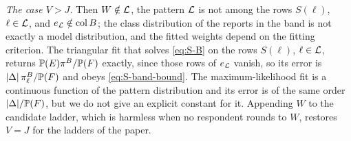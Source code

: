 \emph{The case $V>J$.} Then $W\notin\mathcal{L}$, the pattern $\mathcal{L}$ is not among the rows $S(\ell)$, $\ell\in\mathcal{L}$, and $e_{\mathcal{L}}\notin\operatorname{col}B$; the class distribution of the reports in the band is not exactly a model distribution, and the fitted weights depend on the fitting criterion. The triangular fit that solves \eqref{eq:S-B} on the rows $S(\ell)$, $\ell\in\mathcal{L}$, returns $\mathbb{P}(E)\pi^B/\mathbb{P}(F)$ exactly, since those rows of $e_{\mathcal{L}}$ vanish, so its error is $|\Delta|\,\pi^B_\ell/\mathbb{P}(F)$ and obeys \eqref{eq:S-band-bound}. The maximum-likelihood fit is a continuous function of the pattern distribution and its error is of the same order $|\Delta|/\mathbb{P}(F)$, but we do not give an explicit constant for it. Appending $W$ to the candidate ladder, which is harmless when no respondent rounds to $W$, restores $V=J$ for the ladders of the paper.
